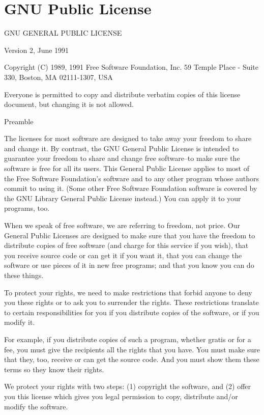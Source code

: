 \section{GNU Public License}\label{gpl_appendix}

\begin{small}
\begin{center}
GNU GENERAL PUBLIC LICENSE

Version 2, June 1991


Copyright (C) 1989, 1991 Free Software Foundation, Inc.  
59 Temple Place - Suite 330, Boston, MA  02111-1307, USA


Everyone is permitted to copy and distribute verbatim copies
of this license document, but changing it is not allowed.
\end{center}
Preamble

The licenses for most software are designed to take away your freedom to share
and change it. By contrast, the GNU General Public License is intended to
guarantee your freedom to share and change free software--to make sure the
software is free for all its users. This General Public License applies to
most of the Free Software Foundation's software and to any other program whose
authors commit to using it. (Some other Free Software Foundation software is
covered by the GNU Library General Public License instead.) You can apply it
to your programs, too.

When we speak of free software, we are referring to freedom, not price. Our
General Public Licenses are designed to make sure that you have the freedom to
distribute copies of free software (and charge for this service if you wish),
that you receive source code or can get it if you want it, that you can change
the software or use pieces of it in new free programs; and that you know you
can do these things.

To protect your rights, we need to make restrictions that forbid anyone to
deny you these rights or to ask you to surrender the rights. These
restrictions translate to certain responsibilities for you if you distribute
copies of the software, or if you modify it.

For example, if you distribute copies of such a program, whether gratis or for
a fee, you must give the recipients all the rights that you have. You must
make sure that they, too, receive or can get the source code. And you must
show them these terms so they know their rights.

We protect your rights with two steps: (1) copyright the software, and (2)
offer you this license which gives you legal permission to copy, distribute
and/or modify the software.


\end{small}

